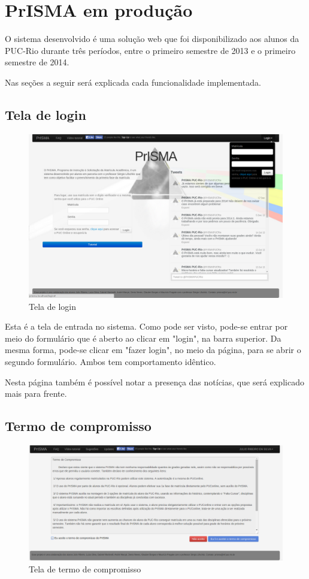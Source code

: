 \documentclass[graduacao,brazil]{ThesisPUC}
\begin{document}
\chapter{PrISMA em produção}

O sistema desenvolvido é uma solução web que foi disponibilizado aos alunos da PUC-Rio durante três períodos, entre o primeiro semestre de 2013 e o primeiro semestre de 2014. 

Nas seções a seguir será explicada cada funcionalidade implementada.

\section{Tela de login}

\begin{figure}[H]
    \centering
    \includegraphics[width=0.9\linewidth]{img/v3_tela_login.png}
    \caption{Tela de login}
\end{figure}

Esta é a tela de entrada no sistema. Como pode ser visto, pode-se entrar por meio do formulário que é aberto ao clicar em "login", na barra superior. Da mesma forma, pode-se clicar em "fazer login", no meio da página, para se abrir o segundo formulário. Ambos tem comportamento idêntico. 

Nesta página também é possível notar a presença das notícias, que será explicado mais para frente.

\section{Termo de compromisso}

\begin{figure}[H]
    \centering
    \includegraphics[width=\linewidth]{img/v3_tela_termo.png}
    \caption{Tela de termo de compromisso}
\end{figure}
\end{document}
